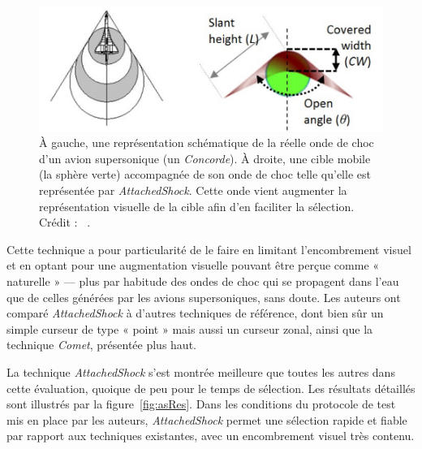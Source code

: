 	\begin{figure}[H]
		\centering
		\includegraphics[width=\textwidth]{figures/ch2/asas}
		\caption[\emph{AttachedShock}, onde de choc]{À gauche, une représentation schématique de la réelle onde de choc d'un avion supersonique (un \emph{Concorde}). À droite, une cible mobile (la sphère verte) accompagnée de son onde de choc telle qu'elle est représentée par \emph{AttachedShock}. Cette onde vient augmenter la représentation visuelle de la cible afin d'en faciliter la sélection. Crédit : ~\cite{you2012attachedshock}.}
		\label{fig:asas}
	\end{figure}
	
Cette technique a pour particularité de le faire en limitant l'encombrement visuel et en optant pour une augmentation visuelle pouvant être perçue comme « naturelle » --- plus par habitude des ondes de choc qui se propagent dans l'eau que de celles générées par les avions supersoniques, sans doute. Les auteurs ont comparé \emph{AttachedShock} à d'autres techniques de référence, dont bien sûr un simple curseur de type « point » mais aussi un curseur zonal, ainsi que la technique \emph{Comet}, présentée plus haut.

La technique \emph{AttachedShock} s'est montrée meilleure que toutes les autres dans cette évaluation, quoique de peu pour le temps de sélection. Les résultats détaillés sont illustrés par la figure~\ref{fig:asRes}. Dans les conditions du protocole de test mis en place par les auteurs, \emph{AttachedShock} permet une sélection rapide et fiable par rapport aux techniques existantes, avec un encombrement visuel très contenu.
	
